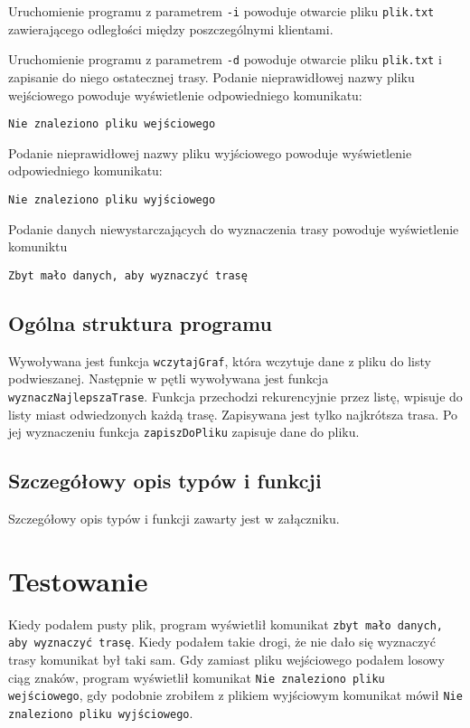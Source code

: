 \documentclass[12pt,a4paper,twoside]{article}
\let\oldmarginpar\marginpar
\renewcommand\marginpar[1]{%
  {\linespread{0.85}\normalfont\scriptsize%
\oldmarginpar[\hspace{1cm}\begin{minipage}{3cm}\raggedleft\scriptsize\color{black}\textsf{#1}\end{minipage}]%
{\hspace{0cm}\begin{minipage}{3cm}\raggedright\scriptsize\color{black}\textsf{#1}\end{minipage}}%
}%
}
\begin{document}
Uruchomienie programu z parametrem \texttt{-i} powoduje otwarcie pliku \texttt{plik.txt}  zawierającego odległości między poszczególnymi klientami. 


Uruchomienie programu z parametrem \texttt{-d} powoduje otwarcie pliku \texttt{plik.txt}  i zapisanie do niego ostatecznej trasy. 
Podanie nieprawidłowej nazwy pliku wejściowego powoduje wyświetlenie odpowiedniego komunikatu:
\begin{verbatim}
Nie znaleziono pliku wejściowego
\end{verbatim}
Podanie nieprawidłowej nazwy pliku wyjściowego powoduje wyświetlenie odpowiedniego komunikatu:
\begin{verbatim}
Nie znaleziono pliku wyjściowego
\end{verbatim}

Podanie danych niewystarczających do wyznaczenia trasy powoduje wyświetlenie komuniktu
\begin{verbatim}
Zbyt mało danych, aby wyznaczyć trasę
\end{verbatim}




\subsection{Ogólna struktura programu}
\marginpar{}
Wywoływana jest funkcja \lstinline|wczytajGraf|, która wczytuje dane z pliku do listy podwieszanej. 
Następnie w pętli wywoływana jest funkcja \lstinline|wyznaczNajlepszaTrase|. 
Funkcja przechodzi rekurencyjnie przez listę, wpisuje do listy miast odwiedzonych każdą trasę. 
Zapisywana jest tylko najkrótsza trasa. Po jej wyznaczeniu funkcja \lstinline|zapiszDoPliku| zapisuje dane do pliku.



\subsection{Szczegółowy opis typów i funkcji}

Szczegółowy opis typów i funkcji zawarty jest w załączniku. 

\section{Testowanie}
\marginpar{}

Kiedy podałem pusty plik, program wyświetlił komunikat \texttt{zbyt mało danych, aby wyznaczyć trasę}. Kiedy podałem takie drogi, że nie dało się wyznaczyć trasy komunikat był taki sam. 
Gdy zamiast pliku wejściowego podałem losowy ciąg znaków, program wyświetlił komunikat \texttt{Nie znaleziono pliku wejściowego}, gdy podobnie zrobiłem z plikiem wyjściowym komunikat mówił \texttt{Nie znaleziono pliku wyjściowego}.
\end{document}
